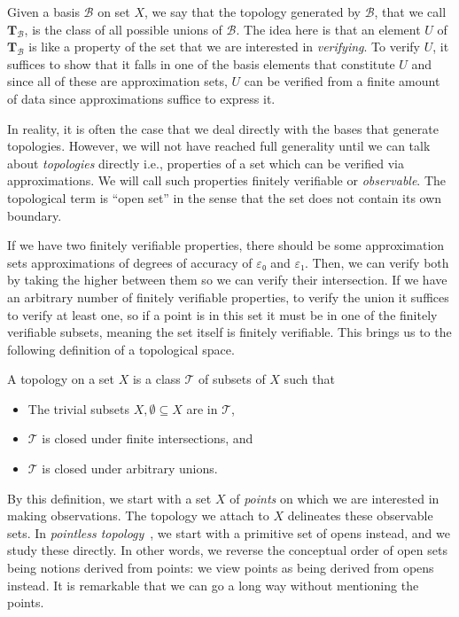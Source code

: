 Given a basis $\mathcal{B}$ on set $X$, we say that the topology generated by
$\mathcal{B}$, that we call $\mathbf{T}_{\mathcal{B}}$, is the class of all possible
unions of $\mathcal{B}$. The idea here is that an element $U$ of
$\mathbf{T}_{\mathcal{B}}$ is like a property of the set that we are interested in
\emph{verifying}. To verify $U$, it suffices to show that it falls in one of the basis
elements that constitute $U$ and since all of these are approximation sets, $U$ can be
verified from a finite amount of data since approximations suffice to express it.

In reality, it is often the case that we deal directly with the bases that generate
topologies. However, we will not have reached full generality until we can talk about
\emph{topologies} directly i.e., properties of a set which can be verified via
approximations. We will call such properties finitely verifiable or \emph{observable}. The
topological term is ``open set'' in the sense that the set does not contain its own
boundary.

If we have two finitely verifiable properties, there should be some approximation sets
approximations of degrees of accuracy of $ε₀$ and $ε₁$. Then, we can verify both by taking
the higher between them so we can verify their intersection. If we have an arbitrary
number of finitely verifiable properties, to verify the union it suffices to verify at
least one, so if a point is in this set it must be in one of the finitely verifiable
subsets, meaning the set itself is finitely verifiable. This brings us to the following
definition of a topological space.
\begin{defn}\label{defn:topospace}
  A topology on a set $X$ is a class $\mathcal{T}$ of subsets of $X$ such that
  \begin{itemize}
    \item The trivial subsets $X, \emptyset \subseteq X$ are in $\mathcal{T}$,
    \item $\mathcal{T}$ is closed under finite intersections, and
    \item $\mathcal{T}$ is closed under arbitrary unions.
  \end{itemize}
\end{defn}

By this definition, we start with a set $X$ of \emph{points} on which we are interested in
making observations. The topology we attach to $X$ delineates these observable sets. In
\emph{pointless topology}~\cite{johnstone-the-point}, we start with a primitive set of
opens instead, and we study these directly. In other words, we reverse the conceptual
order of open sets being notions derived from points: we view points as being derived from
opens instead. It is remarkable that we can go a long way without mentioning the points.

